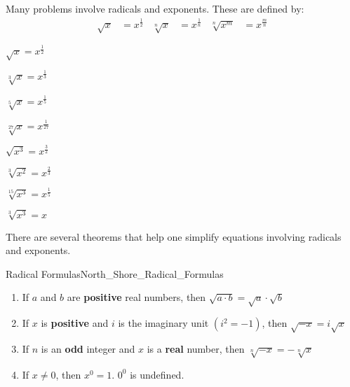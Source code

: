 \documentclass[crop=false,class=article,oneside]{standalone}
\begin{document}
        Many problems involve radicals and exponents.
        These are defined by:
        \begin{align*}
            \sqrt{x}&=x^{\frac{1}{2}}
            &
            \sqrt[n]{x}&=x^{\frac{1}{n}}
            &
            \sqrt[n]{x^m}&=x^{\frac{m}{n}}
        \end{align*}
        \begin{frameexample}{}{}
            \begin{enumerate}
                \begin{multicols}{4}
                    \item $\sqrt{x}=x^{\frac{1}{2}}$
                    \item $\sqrt[3]{x}=x^{\frac{1}{3}}$
                    \item $\sqrt[5]{x}=x^{\frac{1}{5}}$
                    \item $\sqrt[27]{x}=x^{\frac{1}{27}}$
                    \item $\sqrt{x^3}=x^{\frac{3}{2}}$
                    \item $\sqrt[3]{x^2}=x^{\frac{2}{3}}$
                    \item $\sqrt[15]{x^3}=x^{\frac{1}{5}}$
                    \item $\sqrt[3]{x^3}=x$
                \end{multicols}
            \end{enumerate}
        \end{frameexample}
        There are several theorems that help one simplify
        equations involving radicals and exponents.
        \begin{frametheorem}{Radical Formulas}{North_Shore_Radical_Formulas}
            \begin{enumerate}
                \item If $a$ and $b$ are \textbf{positive} real numbers,
                      then $\sqrt{{a}\cdot{b}}=\sqrt{a}\cdot\sqrt{b}$
                \item If $x$ is \textbf{positive} and $i$ is the
                      imaginary unit $(i^{2}=-1)$, then $\sqrt{-x}=i\sqrt{x}$
                \item If $n$ is an \textbf{odd} integer
                      and $x$ is a \textbf{real} number,
                      then $\sqrt[n]{-x}=-\sqrt[n]{x}$
                \item If $x\ne{0}$, then $x^{0}=1$. $0^{0}$ is undefined.
            \end{enumerate}
        \end{frametheorem}
\end{document}
